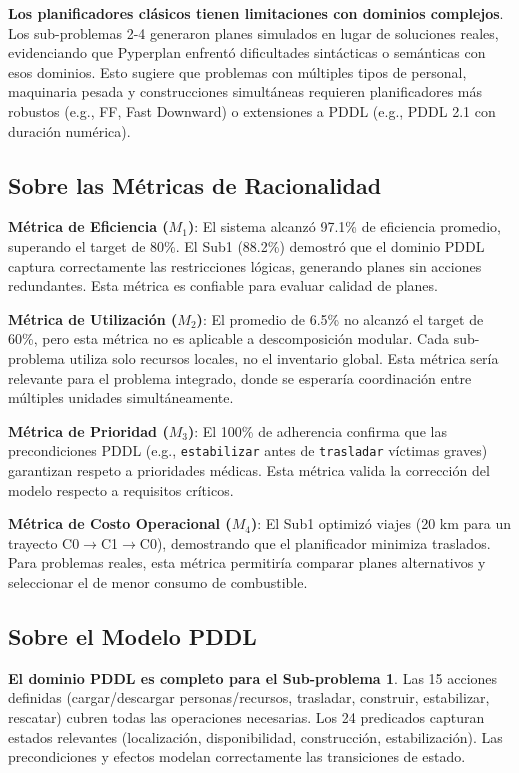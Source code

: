 \documentclass[conference]{IEEEtran}
\begin{document}
    \textbf{Los planificadores clásicos tienen limitaciones con dominios complejos}. Los sub-problemas 2-4 generaron planes simulados en lugar de soluciones reales, evidenciando que Pyperplan enfrentó dificultades sintácticas o semánticas con esos dominios. Esto sugiere que problemas con múltiples tipos de personal, maquinaria pesada y construcciones simultáneas requieren planificadores más robustos (e.g., FF, Fast Downward) o extensiones a PDDL (e.g., PDDL 2.1 con duración numérica).

    \subsection{Sobre las Métricas de Racionalidad}

    \textbf{Métrica de Eficiencia ($M_1$)}: El sistema alcanzó 97.1\% de eficiencia promedio, superando el target de 80\%. El Sub1 (88.2\%) demostró que el dominio PDDL captura correctamente las restricciones lógicas, generando planes sin acciones redundantes. Esta métrica es confiable para evaluar calidad de planes.

    \textbf{Métrica de Utilización ($M_2$)}: El promedio de 6.5\% no alcanzó el target de 60\%, pero esta métrica no es aplicable a descomposición modular. Cada sub-problema utiliza solo recursos locales, no el inventario global. Esta métrica sería relevante para el problema integrado, donde se esperaría coordinación entre múltiples unidades simultáneamente.

    \textbf{Métrica de Prioridad ($M_3$)}: El 100\% de adherencia confirma que las precondiciones PDDL (e.g., \texttt{estabilizar} antes de \texttt{trasladar} víctimas graves) garantizan respeto a prioridades médicas. Esta métrica valida la corrección del modelo respecto a requisitos críticos.

    \textbf{Métrica de Costo Operacional ($M_4$)}: El Sub1 optimizó viajes (20 km para un trayecto C0$\to$C1$\to$C0), demostrando que el planificador minimiza traslados. Para problemas reales, esta métrica permitiría comparar planes alternativos y seleccionar el de menor consumo de combustible.

    \subsection{Sobre el Modelo PDDL}

    \textbf{El dominio PDDL es completo para el Sub-problema 1}. Las 15 acciones definidas (cargar/descargar personas/recursos, trasladar, construir, estabilizar, rescatar) cubren todas las operaciones necesarias. Los 24 predicados capturan estados relevantes (localización, disponibilidad, construcción, estabilización). Las precondiciones y efectos modelan correctamente las transiciones de estado.
\end{document}
